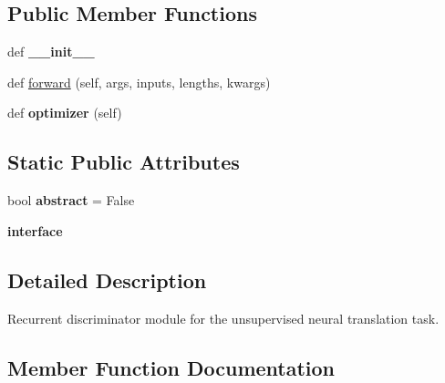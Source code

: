 \subsection*{Public Member Functions}
\begin{DoxyCompactItemize}
\item 
def {\bfseries \+\_\+\+\_\+init\+\_\+\+\_\+}\hypertarget{classutils_1_1RNNClassifier_a9b33511af3a7d4ae92ad9b05d3935c29}{}\label{classutils_1_1RNNClassifier_a9b33511af3a7d4ae92ad9b05d3935c29}

\item 
def \hyperlink{classutils_1_1RNNClassifier_a2c1239e36a2328d84d996efc58914fbc}{forward} (self, args, inputs, lengths, kwargs)
\item 
def {\bfseries optimizer} (self)\hypertarget{classutils_1_1RNNClassifier_aea9f4a338752cd3bba6e4f16ee75bac4}{}\label{classutils_1_1RNNClassifier_aea9f4a338752cd3bba6e4f16ee75bac4}

\end{DoxyCompactItemize}
\subsection*{Static Public Attributes}
\begin{DoxyCompactItemize}
\item 
bool {\bfseries abstract} = False\hypertarget{classutils_1_1RNNClassifier_af2415485f9ea60e4f8a31a72f79ef3e1}{}\label{classutils_1_1RNNClassifier_af2415485f9ea60e4f8a31a72f79ef3e1}

\item 
{\bfseries interface}
\end{DoxyCompactItemize}


\subsection{Detailed Description}
\begin{DoxyVerb}Recurrent discriminator module for the unsupervised neural translation task.
\end{DoxyVerb}
 

\subsection{Member Function Documentation}
